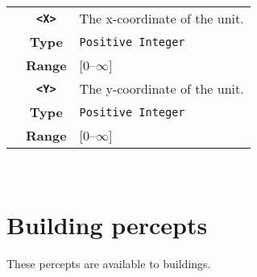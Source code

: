 \begin{tabularx}{\textwidth}{l | c | p{8cm}|}
            \cline{2-3} 
            & \textbf{\verb|<X>|} & The x-coordinate of the unit.\\
            & \textbf{Type} & \verb|Positive Integer| \\
            & \textbf{Range} & [0--$\infty$] \\
            \cline{2-3} 
            & \textbf{\verb|<Y>|} & The y-coordinate of the unit.\\
            & \textbf{Type} & \verb|Positive Integer| \\
            & \textbf{Range} & [0--$\infty$] \\
            \cline{2-3} 
\end{tabularx}\\



\section{Building percepts}
These percepts are available to buildings.

